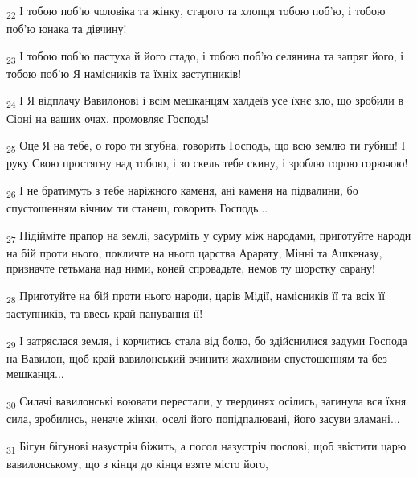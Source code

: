 \begin{tcolorbox}
\textsubscript{22} І тобою поб'ю чоловіка та жінку, старого та хлопця тобою поб'ю, і тобою поб'ю юнака та дівчину!
\end{tcolorbox}
\begin{tcolorbox}
\textsubscript{23} І тобою поб'ю пастуха й його стадо, і тобою поб'ю селянина та запряг його, і тобою поб'ю Я намісників та їхніх заступників!
\end{tcolorbox}
\begin{tcolorbox}
\textsubscript{24} І Я відплачу Вавилонові і всім мешканцям халдеїв усе їхнє зло, що зробили в Сіоні на ваших очах, промовляє Господь!
\end{tcolorbox}
\begin{tcolorbox}
\textsubscript{25} Оце Я на тебе, о горо ти згубна, говорить Господь, що всю землю ти губиш! І руку Свою простягну над тобою, і зо скель тебе скину, і зроблю горою горючою!
\end{tcolorbox}
\begin{tcolorbox}
\textsubscript{26} І не братимуть з тебе наріжного каменя, ані каменя на підвалини, бо спустошенням вічним ти станеш, говорить Господь...
\end{tcolorbox}
\begin{tcolorbox}
\textsubscript{27} Підійміте прапор на землі, засурміть у сурму між народами, приготуйте народи на бій проти нього, покличте на нього царства Арарату, Мінні та Ашкеназу, призначте гетьмана над ними, коней спровадьте, немов ту шорстку сарану!
\end{tcolorbox}
\begin{tcolorbox}
\textsubscript{28} Приготуйте на бій проти нього народи, царів Мідії, намісників її та всіх її заступників, та ввесь край панування її!
\end{tcolorbox}
\begin{tcolorbox}
\textsubscript{29} І затряслася земля, і корчитись стала від болю, бо здійснилися задуми Господа на Вавилон, щоб край вавилонський вчинити жахливим спустошенням та без мешканця...
\end{tcolorbox}
\begin{tcolorbox}
\textsubscript{30} Силачі вавилонські воювати перестали, у твердинях осілись, загинула вся їхня сила, зробились, неначе жінки, оселі його попідпалювані, його засуви зламані...
\end{tcolorbox}
\begin{tcolorbox}
\textsubscript{31} Бігун бігунові назустріч біжить, а посол назустріч послові, щоб звістити царю вавилонському, що з кінця до кінця взяте місто його,
\end{tcolorbox}
